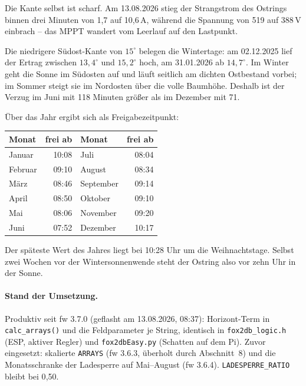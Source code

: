 \documentclass[11pt, a4paper]{article}
\begin{document}
Die Kante selbst ist scharf. Am 13.08.2026 stieg der Strang\-strom des Ostrings
binnen drei Minuten von 1{,}7 auf 10{,}6\,A, während die Spannung von 519 auf
388\,V einbrach -- das MPPT wandert vom Leerlauf auf den Lastpunkt.

Die niedrigere Südost-Kante von $15^\circ$ belegen die Wintertage: am 02.12.2025
lief der Ertrag zwischen $13{,}4^\circ$ und $15{,}2^\circ$ hoch, am 31.01.2026 ab
$14{,}7^\circ$. Im Winter geht die Sonne im Südosten auf und läuft seitlich am
dichten Ostbestand vorbei; im Sommer steigt sie im Nordosten über die volle
Baumhöhe. Deshalb ist der Verzug im Juni mit 118 Minuten größer als im Dezember
mit 71.

Über das Jahr ergibt sich als Freigabezeitpunkt:

\begin{center}
\begin{tabular}{lr@{\qquad}lr}
\toprule
Monat & frei ab & Monat & frei ab\\
\midrule
Januar  & 10:08 & Juli      & 08:04\\
Februar & 09:10 & August    & 08:34\\
März    & 08:46 & September & 09:14\\
April   & 08:50 & Oktober   & 09:10\\
Mai     & 08:06 & November  & 09:20\\
Juni    & 07:52 & Dezember  & 10:17\\
\bottomrule
\end{tabular}
\end{center}

Der späteste Wert des Jahres liegt bei 10:28 Uhr um die Weihnachtstage. Selbst
zwei Wochen vor der Wintersonnenwende steht der Ostring also vor zehn Uhr in der
Sonne.

\paragraph{Stand der Umsetzung.} Produktiv seit fw 3.7.0 (geflasht am 13.08.2026,
08:37): Horizont-Term in \texttt{calc\_arrays()} und die Feldparameter je String,
identisch in \texttt{fox2db\_logic.h} (ESP, aktiver Regler) und
\texttt{fox2dbEasy.py} (Schatten auf dem Pi). Zuvor eingesetzt: skalierte
\texttt{ARRAYS} (fw 3.6.3, überholt durch Abschnitt~8) und die Monatsschranke
der Ladesperre auf Mai--August (fw 3.6.4). \texttt{LADESPERRE\_RATIO} bleibt bei
0{,}50.
\end{document}
